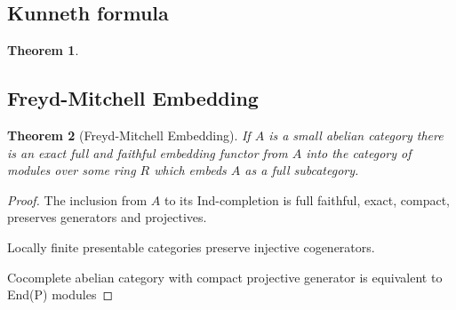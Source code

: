 \documentclass[12pt]{article}
\numberwithin{equation}{section}
\newtheorem{theorem}{Theorem}[section]
\begin{document}
	\subsection{Kunneth formula}
	\begin{theorem}
		
	\end{theorem}
	\subsection{Freyd-Mitchell Embedding}
	\begin{theorem}[Freyd-Mitchell Embedding]
		If $A$ is a small abelian category there is an exact full and faithful embedding functor from $A$ into the category of modules over some ring $R$ which embeds $A$ as a full subcategory.
	\end{theorem}
	\begin{proof}
		The inclusion from $A$ to its Ind-completion is full faithful, exact, compact, preserves generators and projectives.
		
		Locally finite presentable categories preserve injective cogenerators.
		
		Cocomplete abelian category with compact projective	generator is equivalent to End(P) modules
	\end{proof}
	
\end{document}

